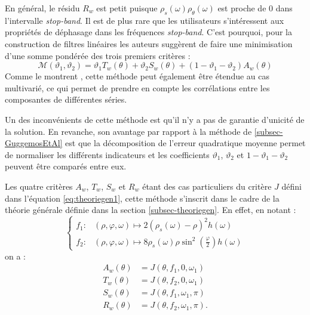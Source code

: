 \documentclass[
  11pt,
  french,
  a4paper]{article}
\newcommand\1{\mathds{1}}
\begin{document}
En général, le résidu \(R_w\) est petit puisque \(\rho_s(\omega)\rho_\theta(\omega)\) est proche de 0 dans l'intervalle \emph{stop-band}.
Il est de plus rare que les utilisateurs s'intéressent aux propriétés de déphasage dans les fréquences \emph{stop-band}.
C'est pourquoi, pour la construction de filtres linéaires les auteurs suggèrent de faire une minimisation d'une somme pondérée des trois premiers critères :
\[
\mathcal{M}(\vartheta_{1},\vartheta_{2})=\vartheta_{1}T_w(\theta)+\vartheta_{2}S_w(\theta)+(1-\vartheta_{1}-\vartheta_{2})A_w(\theta)
\]
Comme le montrent \textcite{tuckerwildi2020}, cette méthode peut également être étendue au cas multivarié, ce qui permet de prendre en compte les corrélations entre les composantes de différentes séries.

Un des inconvénients de cette méthode est qu'il n'y a pas de garantie d'unicité de la solution.
En revanche, son avantage par rapport à la méthode de \ref{subsec-GuggemosEtAl} est que la décomposition de l'erreur quadratique moyenne permet de normaliser les différents indicateurs et les coefficients \(\vartheta_{1}\), \(\vartheta_{2}\) et \(1-\vartheta_{1}-\vartheta_{2}\) peuvent être comparés entre eux.

Les quatre critères \(A_w\), \(T_w\), \(S_w\) et \(R_w\) étant des cas particuliers du critère \(J\) défini dans l'équation \eqref{eq:theoriegen1}, cette méthode s'inscrit dans le cadre de la théorie générale définie dans la section \ref{subsec-theoriegen}.
En effet, en notant :
\[
\begin{cases}
    f_1\colon&(\rho,\varphi, \omega)\mapsto2\left(\rho_s(\omega)-\rho\right)^{2}h(\omega) \\
    f_2\colon&(\rho,\varphi, \omega)\mapsto8\rho_s(\omega)\rho\sin^{2}\left(\frac{\varphi}{2}\right)h(\omega)
\end{cases}
\]
on a :
\begin{align*}
A_w(\theta)&= J(\theta,f_1,0,\omega_1)\\
T_w(\theta)&= J(\theta,f_2,0,\omega_1)\\
S_w(\theta)&= J(\theta,f_1,\omega_1,\pi)\\
R_w(\theta)&= J(\theta,f_2,\omega_1,\pi).
\end{align*}
\end{document}

